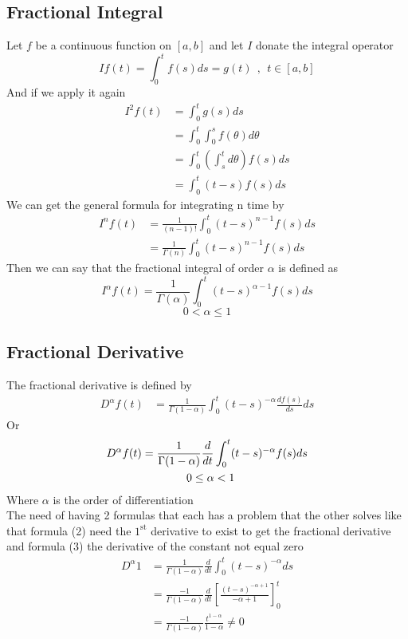 \documentclass[]{article}
\begin{document}
\subsection{Fractional Integral}
Let $f$ be a continuous function on $[a,b]$ and let $I$ donate the integral operator
\[
    If(t) = \int_{0}^{t}f(s)ds = g(t) \ \ , \ \ t\in[a,b]
\]
And if we apply it again
\begin{align*}
    I^{2}f(t) & = \int_{0}^{t}g(s)ds                                  \\
              & = \int_{0}^{t}\int_{0}^{s}f(\theta)d\theta            \\
              & = \int_{0}^{t} \left(\int_{s}^{t}d\theta\right)f(s)ds \\
              & = \int_{0}^{t} (t-s) f(s) ds
\end{align*}
We can get the general formula for integrating n time by
\begin{align*}
    I^{n}f(t) & = \frac{1}{(n-1)!}\int_{0}^{t}(t-s)^{n-1}f(s)ds   \\
              & =\frac{1}{\Gamma(n)}\int_{0}^{t}(t-s)^{n-1}f(s)ds
\end{align*}
Then we can say that the fractional integral of order $\alpha$ is defined as
\begin{equation}
    I^{\alpha}f(t) =\frac{1}{\Gamma(\alpha)}\int_{0}^{t}(t-s)^{\alpha-1}f(s)ds
\end{equation}
\[
    0<\alpha\leq 1
\]
\subsection{Fractional Derivative}
The fractional derivative is defined by
\begin{align}
    D^{\alpha}f(t) & = \frac{1}{\Gamma(1-\alpha)}\int_{0}^{t}(t-s)^{-\alpha}\frac{d f(s)}{ds}ds
\end{align}
Or
\begin{align}
    D^{\alpha}f(t) & = \frac{1}{\Gamma(1-\alpha)}\frac{d}{dt}\int_{0}^{t}(t-s)^{-\alpha}f(s)ds
    \\\notag
                   & \quad\quad\quad\quad0\leq \alpha < 1
\end{align}
Where $\alpha$ is the order of differentiation
\\
The need of having 2 formulas that each has a problem that the other solves
like that formula (2) need the $1^{\text{st}}$ derivative to exist to get the fractional derivative
and formula (3) the derivative of the constant not equal zero
\begin{align*}
    D^{\alpha} 1 & = \frac{1}{\Gamma(1-\alpha)}\frac{d}{dt}\int_{0}^{t}(t-s)^{-\alpha}ds
    \\
                 & = \frac{-1}{\Gamma(1-\alpha)}\frac{d}{dt} \left[\frac{(t-s)^{-\alpha+1}}{-\alpha+1}\right]_{0}^{t}
    \\
                 & = \frac{-1}{\Gamma(1-\alpha)} \frac{t^{1-\alpha}}{1-\alpha} \neq 0
\end{align*}
\end{document}
